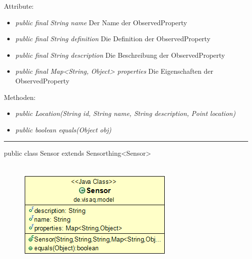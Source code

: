 Attribute:
\begin{itemize}
	\item \emph{public final String name} Der Name der ObservedProperty
	\item \emph{public final String definition} Die Definition der ObservedProperty
	\item \emph{public final String description} Die Beschreibung der ObservedProperty
	\item \emph{public final Map<String, Object> properties} Die Eigenschaften der ObservedProperty
\end{itemize}
Methoden:
\begin{itemize}
	\item \emph{public Location(String id, String name, String description, Point location)} 
	\item \emph{public boolean equals(Object obj)} 
\end{itemize}

\rule{\textwidth}{0.4pt}
public class Sensor extends Sensorthing<Sensor>
\\\\
\begin{minipage}{0.3\textwidth}
	\begin{figure}[H]
		\includegraphics[scale = 0.5
		]{media/frontend/model/SensorClass.png}
	\end{figure}
\end{minipage} \hfill
\begin{minipage}{0.6\textwidth}
\end{minipage}

